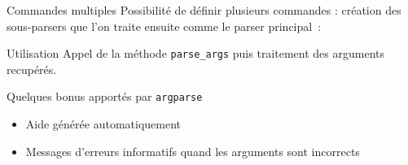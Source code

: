 \begin{frame}{Commandes multiples}
  Possibilité de définir plusieurs commandes : création des sous-parsers que l'on traite ensuite comme le parser principal~:

\end{frame}

\begin{frame}{Utilisation}
  Appel de la méthode \texttt{parse\_args} puis traitement des arguments recupérés.

\end{frame}

\begin{frame}{Quelques bonus apportés par \texttt{argparse}}
  \begin{itemize}[<+->]
    \item Aide générée automatiquement
    \item Messages d'erreurs informatifs quand les arguments sont incorrects
  \end{itemize}
\end{frame}
